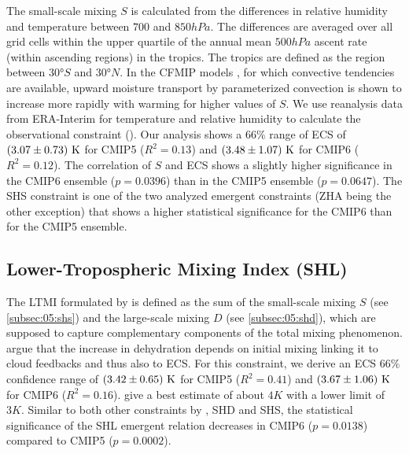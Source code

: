 The small-scale mixing $S$ \autocite{Sherwood2014} is calculated from the
differences in relative humidity and temperature between $700$ and $850
\unit{hPa}$. The differences are averaged over all grid cells within the upper
quartile of the annual mean $500 \unit{hPa}$ ascent rate (within ascending
regions) in the tropics. The tropics are defined as the region between $30
\unit{\degree S}$ and $30 \unit{\degree N}$. In the \ac{CFMIP} models
\autocite{Webb2017}, for which convective tendencies are available, upward
moisture transport by parameterized convection is shown to increase more
rapidly with warming for higher values of $S$. We use reanalysis data from
ERA-Interim \autocite{Dee2011} for temperature and relative humidity to
calculate the observational constraint (). Our analysis shows
a $66 \unit{\%}$ range of \ac{ECS} of $\pmrangeunit{3.07}{0.73}{K}$ for
\acs{CMIP}5 ($R^2 = 0.13$) and $\pmrangeunit{3.48}{1.07}{K}$ for \acs{CMIP}6
($R^2 = 0.12$). The correlation of $S$ and \acs{ECS} shows a slightly higher
significance in the \acs{CMIP}6 ensemble ($p = 0.0396$) than in the \acs{CMIP}5
ensemble ($p = 0.0647$). The SHS constraint is one of the two analyzed emergent
constraints (ZHA being the other exception) that shows a higher statistical
significance for the \acs{CMIP}6 than for the \acs{CMIP}5 ensemble.


\subsection{Lower-Tropospheric Mixing Index (SHL)}
\label{subsec:05:shl}

The \ac{LTMI} formulated by \textcite{Sherwood2014} is defined as the sum of
the small-scale mixing $S$ (see \cref{subsec:05:shs}) and the large-scale
mixing $D$ (see \cref{subsec:05:shd}), which are supposed to capture
complementary components of the total mixing phenomenon.
\Textcite{Sherwood2014} argue that the increase in dehydration depends on
initial mixing linking it to cloud feedbacks and thus also to \ac{ECS}. For
this constraint, we derive an \ac{ECS} $66 \unit{\%}$ confidence range of
$\pmrangeunit{3.42}{0.65}{K}$ for \acs{CMIP}5 ($R^2 = 0.41$) and
$\pmrangeunit{3.67}{1.06}{K}$ for \acs{CMIP}6 ($R^2 = 0.16$).
\Textcite{Sherwood2014} give a best estimate of about $4 \unit{K}$ with a lower
limit of $3 \unit{K}$. Similar to both other constraints by
\textcite{Sherwood2014}, SHD and SHS, the statistical significance of the SHL
emergent relation decreases in \acs{CMIP}6 ($p = 0.0138$) compared to
\acs{CMIP}5 ($p = 0.0002$).


